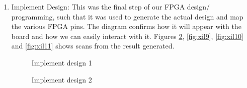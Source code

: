 \documentclass[12pt]{article}
\begin{document}
\begin{enumerate}
  \item Implement Design: This was the final step of our FPGA design/ programming, such that it was used to generate the actual design and map the various FPGA pins. The diagram confirms how it will appear with the board and how we can easily interact with it. Figures \ref{fig:xil8}, \ref{fig:xil9}, \ref{fig:xil10} and \ref{fig:xil11} shows scans from the result generated.  
  
\begin{figure}[H]
\caption{Implement design 1}
\label{fig:xil7}
\end{figure}  

\begin{figure}[H]
\caption{Implement design 2}
\label{fig:xil8}
\end{figure}  


\end{enumerate}
\end{document}
